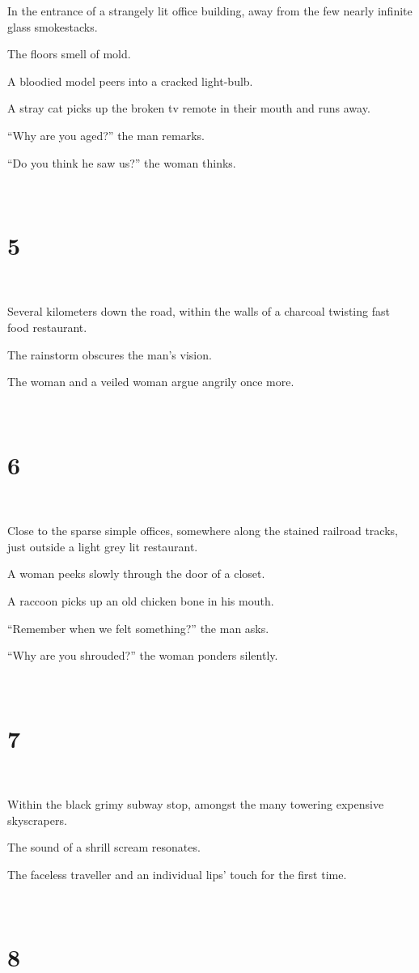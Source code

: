 \documentclass{report}
\begin{document}
In the entrance of a strangely lit office building, away from the few nearly infinite glass smokestacks.

The floors smell of mold.

A bloodied model peers into a cracked light-bulb.

A stray cat picks up the broken tv remote in their mouth and runs away.

``Why are you aged?'' the man remarks.

``Do you think he saw us?'' the woman thinks.

~
\chapter*{5}
~

Several kilometers down the road, within the walls of a charcoal twisting fast food restaurant.

The rainstorm obscures the man's vision.

The woman and a veiled woman argue angrily once more.

~
\chapter*{6}
~

Close to the sparse simple offices, somewhere along the stained railroad tracks, just outside a light grey lit restaurant.

A woman peeks slowly through the door of a closet.

A raccoon picks up an old chicken bone in his mouth.

``Remember when we felt something?'' the man asks.

``Why are you shrouded?'' the woman ponders silently.

~
\chapter*{7}
~

Within the black grimy subway stop, amongst the many towering expensive skyscrapers.

The sound of a shrill scream resonates.

The faceless traveller and an individual lips' touch for the first time.

~
\chapter*{8}
~
\end{document}
